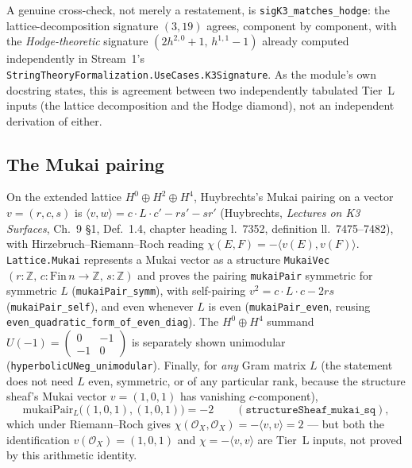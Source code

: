 \documentclass[11pt,a4paper]{article}
\theoremstyle{remark}
\begin{document}
A genuine cross-check, not merely a restatement, is \texttt{sigK3\_matches\_hodge}: the
lattice-decomposition signature $(3,19)$ agrees, component by component, with the
\emph{Hodge-theoretic} signature $(2h^{2,0}+1,\,h^{1,1}-1)$ already computed independently in
Stream~1's \texttt{StringTheoryFormalization.UseCases.K3Signature}. As the module's own docstring
states, this is agreement between two independently tabulated Tier~L inputs (the lattice
decomposition and the Hodge diamond), not an independent derivation of either.

\subsection{The Mukai pairing}
On the extended lattice $H^0\oplus H^2\oplus H^4$, Huybrechts's Mukai pairing on a vector
$v=(r,c,s)$ is $\langle v,w\rangle = c\cdot L\cdot c' - rs'-sr'$ (Huybrechts,
\emph{Lectures on K3 Surfaces}, Ch.~9 \S1, Def.~1.4, chapter heading l.~7352, definition
ll.~7475--7482), with Hirzebruch--Riemann--Roch reading $\chi(E,F)=-\langle v(E),v(F)\rangle$.
\texttt{Lattice.Mukai} represents a Mukai vector as a structure \texttt{MukaiVec}
$(r:\mathbb{Z},\,c:\mathrm{Fin}\,n\to\mathbb{Z},\,s:\mathbb{Z})$ and proves the pairing
\texttt{mukaiPair} symmetric for symmetric $L$ (\texttt{mukaiPair\_symm}), with self-pairing
$v^2=c\cdot L\cdot c-2rs$ (\texttt{mukaiPair\_self}), and even whenever $L$ is even
(\texttt{mukaiPair\_even}, reusing \texttt{even\_quadratic\_form\_of\_even\_diag}). The
$H^0\oplus H^4$ summand $U(-1)=\begin{pmatrix}0&-1\\-1&0\end{pmatrix}$ is separately shown
unimodular (\texttt{hyperbolicUNeg\_unimodular}). Finally, for \emph{any} Gram matrix $L$ (the
statement does not need $L$ even, symmetric, or of any particular rank, because the structure
sheaf's Mukai vector $v=(1,0,1)$ has vanishing $c$-component),
\begin{equation}
  \mathrm{mukaiPair}_L\big((1,0,1),(1,0,1)\big) = -2 \qquad (\texttt{structureSheaf\_mukai\_sq}),
\end{equation}
which under Riemann--Roch gives $\chi(\mathcal{O}_X,\mathcal{O}_X)=-\langle v,v\rangle=2$ --- but
both the identification $v(\mathcal{O}_X)=(1,0,1)$ and $\chi=-\langle v,v\rangle$ are Tier~L
inputs, not proved by this arithmetic identity.
\end{document}
